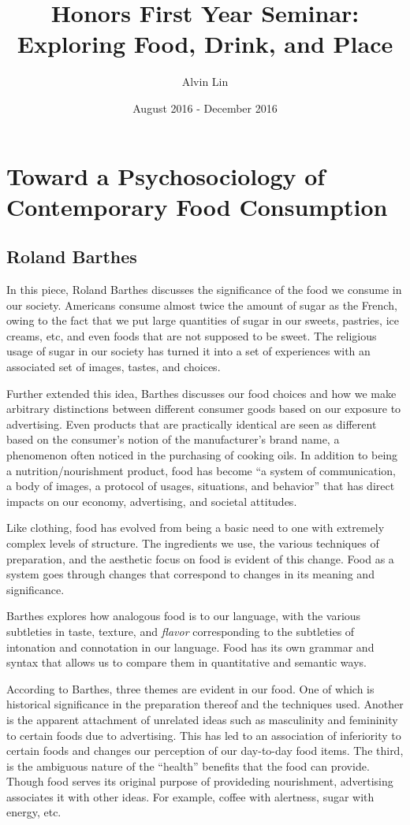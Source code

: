 \documentclass[letterpaper, 12pt]{article}
\title{Honors First Year Seminar: Exploring Food, Drink, and Place}
\author{Alvin Lin}
\date{August 2016 - December 2016}
\begin{document}
\maketitle

\section*{Toward a Psychosociology of Contemporary Food Consumption}
\subsection*{Roland Barthes}
In this piece, Roland Barthes discusses the significance of the food we consume in our society. Americans consume almost twice the amount of sugar as the French, owing to the fact that we put large quantities of sugar in our sweets, pastries, ice creams, etc, and even foods that are not supposed to be sweet. The religious usage of sugar in our society has turned it into a set of experiences with an associated set of images, tastes, and choices. \par
Further extended this idea, Barthes discusses our food choices and how we make arbitrary distinctions between different consumer goods based on our exposure to advertising. Even products that are practically identical are seen as different based on the consumer's notion of the manufacturer's brand name, a phenomenon often noticed in the purchasing of cooking oils. In addition to being a nutrition/nourishment product, food has become ``a system of communication, a body of images, a protocol of usages, situations, and behavior'' that has direct impacts on our economy, advertising, and societal attitudes. \par
Like clothing, food has evolved from being a basic need to one with extremely complex levels of structure. The ingredients we use, the various techniques of preparation, and the aesthetic focus on food is evident of this change. Food as a system goes through changes that correspond to changes in its meaning and significance. \par
Barthes explores how analogous food is to our language, with the various subtleties in taste, texture, and \textit{flavor} corresponding to the subtleties of intonation and connotation in our language. Food has its own grammar and syntax that allows us to compare them in quantitative and semantic ways. \par
According to Barthes, three themes are evident in our food. One of which is historical significance in the preparation thereof and the techniques used. Another is the apparent attachment of unrelated ideas such as masculinity and femininity to certain foods due to advertising. This has led to an association of inferiority to certain foods and changes our perception of our day-to-day food items. The third, is the ambiguous nature of the ``health'' benefits that the food can provide. Though food serves its original purpose of provideding nourishment, advertising associates it with other ideas. For example, coffee with alertness, sugar with energy, etc. \par
\end{document}
